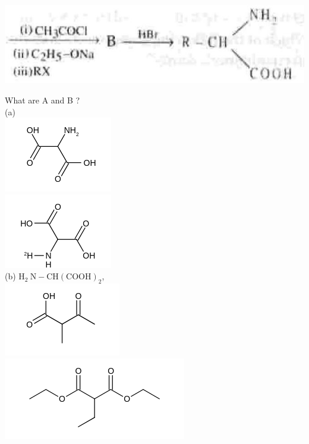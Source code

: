\documentclass[10pt]{article}
\begin{document}
\includegraphics[max width=\textwidth, center]{2025_01_28_8470952b98110cec3aabg-134(2)}

What are A and B ?\\
(a)\\
\includegraphics{smile-9fbfce219eecb19242ace990299e3ada4c10ec6a}\\
\includegraphics{smile-6ebb3d59710c986797a328b8752a9e930a9f3e36}\\
(b) $\mathrm{H}_{2} \mathrm{~N}-\mathrm{CH}(\mathrm{COOH})_{2}$,\\
\includegraphics{smile-c339849b0e9597acc104bfa63e0a3bc32ae3db73}\\
\includegraphics{smile-4eafbd6d798f3dfe89ebda350a935d6248220a0f}\\
\end{document}
